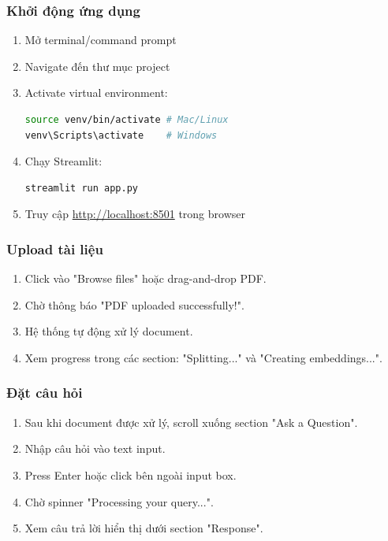 \documentclass[a4paper]{article}
\begin{document}
\subsubsection{Khởi động ứng dụng}
\begin{enumerate}
    \item Mở terminal/command prompt
    \item Navigate đến thư mục project
    \item Activate virtual environment:
    \begin{lstlisting}[language=bash]
source venv/bin/activate # Mac/Linux
venv\Scripts\activate    # Windows
    \end{lstlisting}
    \item Chạy Streamlit:
    \begin{lstlisting}[language=bash]
streamlit run app.py
    \end{lstlisting} %
    \item Truy cập \url{http://localhost:8501} trong browser
\end{enumerate}
\subsubsection{Upload tài liệu}
\begin{enumerate}
    \item Click vào "Browse files" hoặc drag-and-drop PDF.
    \item Chờ thông báo "PDF uploaded successfully!".
    \item Hệ thống tự động xử lý document.
    \item Xem progress trong các section: "Splitting..." và "Creating embeddings...".
\end{enumerate}
\subsubsection{Đặt câu hỏi}
\begin{enumerate}
    \item Sau khi document được xử lý, scroll xuống section "Ask a Question".
    \item Nhập câu hỏi vào text input.
    \item Press Enter hoặc click bên ngoài input box.
    \item Chờ spinner "Processing your query...".
    \item Xem câu trả lời hiển thị dưới section "Response".
\end{enumerate}
\end{document}

